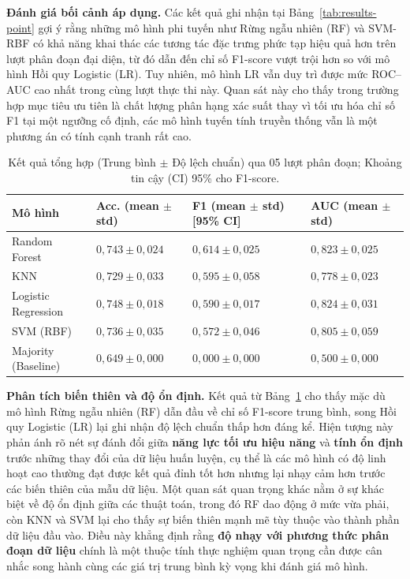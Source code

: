 \documentclass[14pt,a4paper]{extreport}
\begin{document}
\noindent\textbf{Đánh giá bối cảnh áp dụng.} Các kết quả ghi nhận tại Bảng~\ref{tab:results-point} gợi ý rằng những mô hình phi tuyến như Rừng ngẫu nhiên (RF) và SVM-RBF có khả năng khai thác các tương tác đặc trưng phức tạp hiệu quả hơn trên lượt phân đoạn đại diện, từ đó dẫn đến chỉ số F1-score vượt trội hơn so với mô hình Hồi quy Logistic (LR). Tuy nhiên, mô hình LR vẫn duy trì được mức ROC--AUC cao nhất trong cùng lượt thực thi này. Quan sát này cho thấy trong trường hợp mục tiêu ưu tiên là chất lượng phân hạng xác suất thay vì tối ưu hóa chỉ số F1 tại một ngưỡng cố định, các mô hình tuyến tính truyền thống vẫn là một phương án có tính cạnh tranh rất cao.

\begin{table}[htbp]
  \centering
  \small
  \setlength{\tabcolsep}{4pt}
  \caption{Kết quả tổng hợp (Trung bình $\pm$ Độ lệch chuẩn) qua 05 lượt phân đoạn; Khoảng tin cậy (CI) 95\% cho F1-score.}
  \label{tab:results-meanstd}
  \begin{tabular}{l p{2.8cm} p{3.6cm} p{2.8cm}}
    \toprule
    Mô hình & Acc. (mean $\pm$ std) & F1 (mean $\pm$ std) [95\% CI] & AUC (mean $\pm$ std) \\
    \midrule
    Random Forest         & $0,743 \pm 0,024$ & $0,614 \pm 0,025$ \quad [$0,583$; $0,645$] & $0,823 \pm 0,025$ \\
    KNN                   & $0,729 \pm 0,033$ & $0,595 \pm 0,058$ \quad [$0,523$; $0,668$] & $0,778 \pm 0,023$ \\
    Logistic Regression   & $0,748 \pm 0,018$ & $0,590 \pm 0,017$ \quad [$0,570$; $0,611$] & $0,824 \pm 0,031$ \\
    SVM (RBF)             & $0,736 \pm 0,035$ & $0,572 \pm 0,046$ \quad [$0,515$; $0,629$] & $0,805 \pm 0,059$ \\
    Majority (Baseline)   & $0,649 \pm 0,000$ & $0,000 \pm 0,000$ \quad [$0,000$; $0,000$] & $0,500 \pm 0,000$ \\
    \bottomrule
  \end{tabular}
\end{table}

\noindent\textbf{Phân tích biến thiên và độ ổn định.} Kết quả từ Bảng~\ref{tab:results-meanstd} cho thấy mặc dù mô hình Rừng ngẫu nhiên (RF) dẫn đầu về chỉ số F1-score trung bình, song Hồi quy Logistic (LR) lại ghi nhận độ lệch chuẩn thấp hơn đáng kể. Hiện tượng này phản ánh rõ nét sự đánh đổi giữa \textbf{năng lực tối ưu hiệu năng} và \textbf{tính ổn định} trước những thay đổi của dữ liệu huấn luyện, cụ thể là các mô hình có độ linh hoạt cao thường đạt được kết quả đỉnh tốt hơn nhưng lại nhạy cảm hơn trước các biến thiên của mẫu dữ liệu. Một quan sát quan trọng khác nằm ở sự khác biệt về độ ổn định giữa các thuật toán, trong đó RF dao động ở mức vừa phải, còn KNN và SVM lại cho thấy sự biến thiên mạnh mẽ tùy thuộc vào thành phần dữ liệu đầu vào. Điều này khẳng định rằng \textbf{độ nhạy với phương thức phân đoạn dữ liệu} chính là một thuộc tính thực nghiệm quan trọng cần được cân nhắc song hành cùng các giá trị trung bình kỳ vọng khi đánh giá mô hình.
\end{document}

